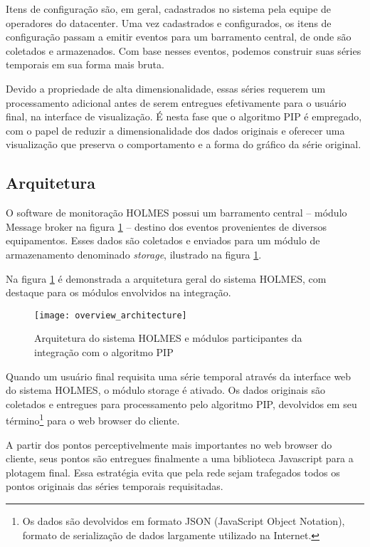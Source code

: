 Itens de configuração são, em geral, cadastrados no sistema pela equipe de operadores do datacenter. Uma vez cadastrados e configurados, os itens de configuração passam a emitir eventos para um barramento central, de onde são coletados e armazenados. Com base nesses eventos, podemos construir suas séries temporais em sua forma mais bruta. 

Devido a propriedade de alta dimensionalidade, essas séries requerem um processamento adicional antes de serem entregues efetivamente para o usuário final, na interface de visualização. É nesta fase que o algoritmo PIP é empregado, com o papel de reduzir a dimensionalidade dos dados originais e oferecer uma visualização que preserva o comportamento e a forma do gráfico da série original.


\subsection{Arquitetura}
O software de monitoração HOLMES possui um barramento central -- módulo Message broker na figura \ref{fig:overview-architecture} -- destino dos eventos provenientes de diversos equipamentos. Esses dados são coletados e enviados para um módulo de armazenamento denominado \textit{storage}, ilustrado na figura \ref{fig:overview-architecture}.

Na figura \ref{fig:overview-architecture} é demonstrada a arquitetura geral do sistema HOLMES, com destaque para os módulos envolvidos na integração.


\begin{figure}[h!]
  \begin{center}
    \texttt{[image: overview\_architecture]}
    \centering
    \caption[Arquitetura do sistema HOLMES]{Arquitetura do sistema HOLMES e módulos participantes da integração com o algoritmo PIP}
  \label{fig:overview-architecture}
  \end{center}
\end{figure}

Quando um usuário final requisita uma série temporal através da interface web do sistema HOLMES, o módulo storage é ativado. Os dados originais são coletados e entregues para processamento pelo algoritmo PIP,  devolvidos em seu término\footnote{Os dados são devolvidos em formato JSON (JavaScript Object Notation),  formato de serialização de dados largamente utilizado na Internet.} para o web browser do cliente.

A partir dos pontos perceptivelmente mais importantes no web browser do cliente, seus pontos são entregues finalmente a uma biblioteca Javascript para a plotagem final. Essa estratégia evita que pela rede sejam trafegados todos os pontos originais das séries temporais requisitadas. 

